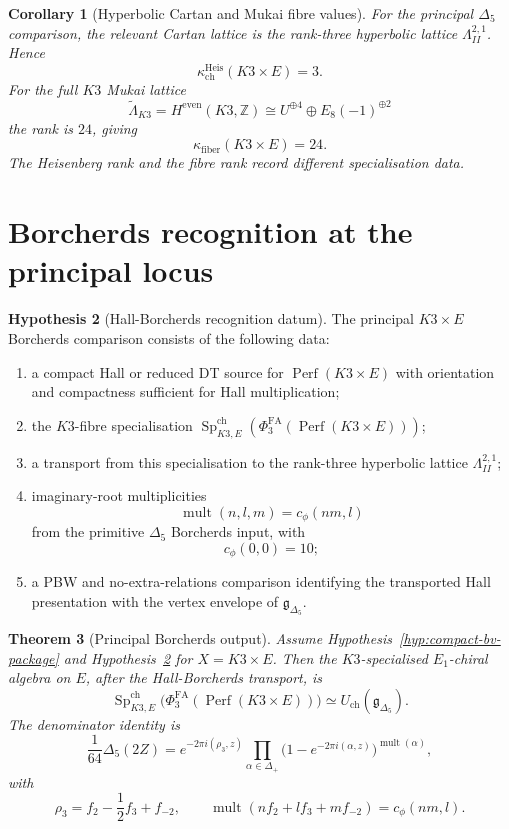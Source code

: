 \documentclass[11pt]{amsart}
\providecommand{\Z}{\mathbb{Z}}
\providecommand{\Lat}{\Lambda}
\providecommand{\PhiFA}{\Phi^{\mathrm{FA}}}
\providecommand{\SpCh}{\operatorname{Sp}^{\mathrm{ch}}}
\providecommand{\Eone}{E_1}
\providecommand{\frakgDelta}{\mathfrak{g}_{\Delta_5}}
\providecommand{\kchH}{\kappa_{\mathrm{ch}}^{\mathrm{Heis}}}
\providecommand{\kfib}{\kappa_{\mathrm{fiber}}}
\theoremstyle{plain}
\newtheorem{theorem}{Theorem}[section]
\newtheorem{corollary}[theorem]{Corollary}
\theoremstyle{definition}
\newtheorem{hypothesis}[theorem]{Hypothesis}
\theoremstyle{remark}
\begin{document}
\begin{corollary}[Hyperbolic Cartan and Mukai fibre values]
\label{cor:heisenberg-values}
For the principal \(\Delta_5\) comparison, the relevant Cartan lattice is
the rank-three hyperbolic lattice \(\Lat^{2,1}_{II}\).  Hence
\[
  \kchH(K3\times E)=3 .
\]
For the full \(K3\) Mukai lattice
\[
  \widetilde{\Lat}_{K3}=H^{\mathrm{even}}(K3,\Z)
  \cong U^{\oplus4}\oplus E_8(-1)^{\oplus2}
\]
the rank is \(24\), giving
\[
  \kfib(K3\times E)=24 .
\]
The Heisenberg rank and the fibre rank record different specialisation
data.
\end{corollary}

\section{Borcherds recognition at the principal locus}
\label{sec:borcherds-recognition}

\begin{hypothesis}[Hall-Borcherds recognition datum]
\label{hyp:hall-borcherds-recognition}
The principal \(K3\times E\) Borcherds comparison consists of the
following data:
\begin{enumerate}
\item a compact Hall or reduced DT source for \(\operatorname{Perf}(K3\times E)\)
with orientation and compactness sufficient for Hall multiplication;
\item the \(K3\)-fibre specialisation
\(\SpCh_{K3,E}(\PhiFA_3(\operatorname{Perf}(K3\times E)))\);
\item a transport from this specialisation to the rank-three hyperbolic
lattice \(\Lat^{2,1}_{II}\);
\item imaginary-root multiplicities
\[
  \operatorname{mult}(n,l,m)=c_{\phi}(nm,l)
\]
from the primitive \(\Delta_5\) Borcherds input, with
\[
  c_{\phi}(0,0)=10;
\]
\item a PBW and no-extra-relations comparison identifying the transported
Hall presentation with the vertex envelope of \(\frakgDelta\).
\end{enumerate}
\end{hypothesis}

\begin{theorem}[Principal Borcherds output]
\label{thm:principal-borcherds-output}
Assume Hypothesis~\ref{hyp:compact-bv-package} and
Hypothesis~\ref{hyp:hall-borcherds-recognition} for \(X=K3\times E\).
Then the \(K3\)-specialised \(\Eone\)-chiral algebra on \(E\), after the
Hall-Borcherds transport, is
\[
  \SpCh_{K3,E}\bigl(\PhiFA_3(\operatorname{Perf}(K3\times E))\bigr)
  \simeq
  U_{\mathrm{ch}}(\frakgDelta).
\]
The denominator identity is
\[
  \frac{1}{64}\Delta_5(2Z)
  =
  e^{-2\pi i(\rho_3,z)}
  \prod_{\alpha\in\Delta_+}
  \bigl(1-e^{-2\pi i(\alpha,z)}\bigr)^{\operatorname{mult}(\alpha)},
\]
with
\[
  \rho_3=f_2-\frac12 f_3+f_{-2},
  \qquad
  \operatorname{mult}(n f_2+l f_3+m f_{-2})=c_{\phi}(nm,l).
\]
\end{theorem}
\end{document}
